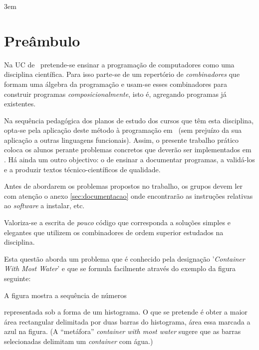 \documentclass[11pt, a4paper, fleqn]{article}
\newcommand{\Varid}[1]{\mathit{#1}}
\def\resethooks{%
  \global\let\SaveRestoreHook\empty
  \global\let\ColumnHook\empty}
\let\hspre\empty
\let\hspost\empty
\begin{document}
\sffamily
\setlength{\parindent}{0em}
\emergencystretch 3em
\renewcommand{\baselinestretch}{1.25} 

\pagestyle{pagestyle}
\setlength{\parindent}{1em}

\section*{Preâmbulo}

Na UC de \CP\ pretende-se ensinar a progra\-mação de computadores como uma disciplina
científica. Para isso parte-se de um repertório de \emph{combinadores} que
formam uma álgebra da programação %
e usam-se esses combinadores para construir programas \emph{composicionalmente},
isto é, agregando programas já existentes.

Na sequência pedagógica dos planos de estudo dos cursos que têm esta disciplina,
opta-se pela aplicação deste método à programação em \Haskell\ (sem prejuízo
da sua aplicação a outras linguagens funcionais). Assim, o presente trabalho
prático coloca os alunos perante problemas concretos que deverão ser implementados
em \Haskell. Há ainda um outro objectivo: o de ensinar a documentar programas,
a validá-los e a produzir textos técnico-científicos de qualidade.

Antes de abordarem os problemas propostos no trabalho, os grupos devem ler
com atenção o anexo \ref{sec:documentacao} onde encontrarão as instruções
relativas ao \emph{software} a instalar, etc.

Valoriza-se a escrita de \emph{pouco} código que corresponda a soluções simples
e elegantes que utilizem os combinadores de ordem superior estudados na disciplina.


\Problema
Esta questão aborda um problema que é conhecido pela designação '\emph{Container
With Most Water}' e que se formula facilmente através do exemplo da figura
seguinte:

	\histogramaA \label{fig:histogramaA}

\noindent
A figura mostra a sequência de números
\resethooks
representada sob a forma de um histograma. O que se pretende é obter a maior
área rectangular delimitada por duas barras do histograma, área essa marcada
a azul na figura. (A ``metáfora'' \emph{container with most water} sugere que
as barras selecionadas delimitam um \emph{container} com água.)
\end{document}
